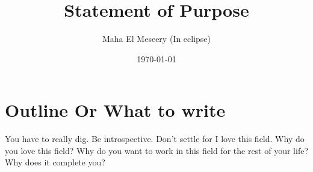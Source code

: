 \documentclass[a4paper,12pt]{article}%
\begin{document}
\title{Statement of Purpose}
\author{Maha El Meseery (In eclipse) }
 
\date{\today}
 
\maketitle 

%

\section{Outline Or What to write}
You have to really dig. Be introspective. Don't settle for I love this field. Why do you love this field? Why do you want to work in this field for the rest of your life? Why does it complete you?
 
\end{document}
